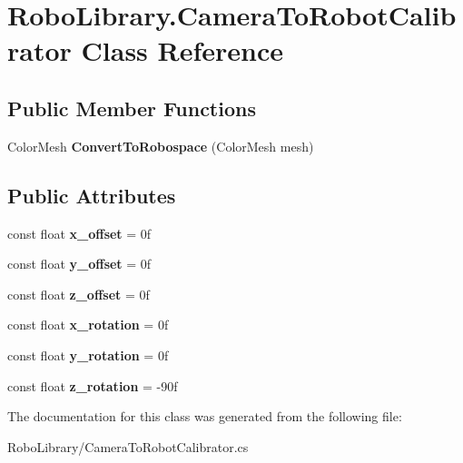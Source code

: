 \hypertarget{class_robo_library_1_1_camera_to_robot_calibrator}{}\section{Robo\+Library.\+Camera\+To\+Robot\+Calibrator Class Reference}
\label{class_robo_library_1_1_camera_to_robot_calibrator}
\subsection*{Public Member Functions}
\begin{DoxyCompactItemize}
\item 
\hypertarget{class_robo_library_1_1_camera_to_robot_calibrator_a25fdd80bf754a9bb60e710373bb6495d}{}\label{class_robo_library_1_1_camera_to_robot_calibrator_a25fdd80bf754a9bb60e710373bb6495d} 
Color\+Mesh {\bfseries Convert\+To\+Robospace} (Color\+Mesh mesh)
\end{DoxyCompactItemize}
\subsection*{Public Attributes}
\begin{DoxyCompactItemize}
\item 
\hypertarget{class_robo_library_1_1_camera_to_robot_calibrator_a69134a5024ee008aa6999ea2981a8d7c}{}\label{class_robo_library_1_1_camera_to_robot_calibrator_a69134a5024ee008aa6999ea2981a8d7c} 
const float {\bfseries x\+\_\+offset} = 0f
\item 
\hypertarget{class_robo_library_1_1_camera_to_robot_calibrator_a5333e43ca61bba12c4fded9f169b8f05}{}\label{class_robo_library_1_1_camera_to_robot_calibrator_a5333e43ca61bba12c4fded9f169b8f05} 
const float {\bfseries y\+\_\+offset} = 0f
\item 
\hypertarget{class_robo_library_1_1_camera_to_robot_calibrator_ab258ba554892ffda94f04d67483e0213}{}\label{class_robo_library_1_1_camera_to_robot_calibrator_ab258ba554892ffda94f04d67483e0213} 
const float {\bfseries z\+\_\+offset} = 0f
\item 
\hypertarget{class_robo_library_1_1_camera_to_robot_calibrator_a8edffd65a172e18c7bafef8b16cc6444}{}\label{class_robo_library_1_1_camera_to_robot_calibrator_a8edffd65a172e18c7bafef8b16cc6444} 
const float {\bfseries x\+\_\+rotation} = 0f
\item 
\hypertarget{class_robo_library_1_1_camera_to_robot_calibrator_a9ce3105bf68d247fcfad9390da1849f0}{}\label{class_robo_library_1_1_camera_to_robot_calibrator_a9ce3105bf68d247fcfad9390da1849f0} 
const float {\bfseries y\+\_\+rotation} = 0f
\item 
\hypertarget{class_robo_library_1_1_camera_to_robot_calibrator_a023b40704091a0cc34835895299be4b1}{}\label{class_robo_library_1_1_camera_to_robot_calibrator_a023b40704091a0cc34835895299be4b1} 
const float {\bfseries z\+\_\+rotation} = -\/90f
\end{DoxyCompactItemize}


The documentation for this class was generated from the following file\+:\begin{DoxyCompactItemize}
\item 
Robo\+Library/Camera\+To\+Robot\+Calibrator.\+cs\end{DoxyCompactItemize}
